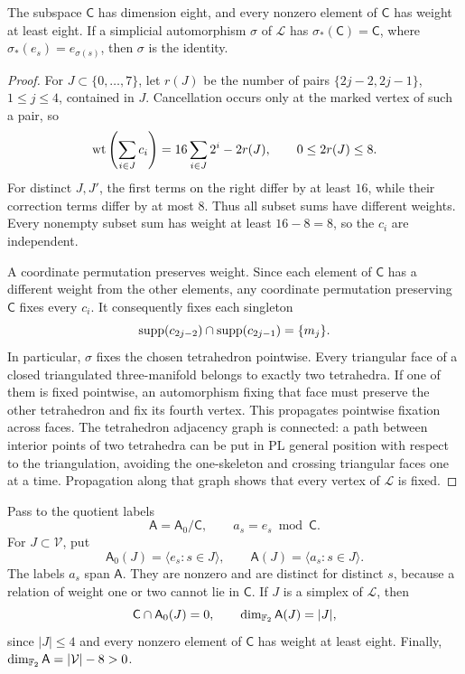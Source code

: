 \begin{lemma}\label{mod:rigid-relations}
The subspace \(\mathsf C\) has dimension eight, and every nonzero
element of \(\mathsf C\) has weight at least eight.  If a simplicial
automorphism \(\sigma\) of \(\mathcal L\) has
\(\sigma_*(\mathsf C)=\mathsf C\), where
\(\sigma_*(e_s)=e_{\sigma(s)}\), then \(\sigma\) is the identity.
\end{lemma}

\begin{proof}
For \(J\subset\{0,\ldots,7\}\), let \(r(J)\) be the number of pairs
\(\{2j-2,2j-1\}\), \(1\leq j\leq4\), contained in \(J\).
Cancellation occurs only at the marked vertex of such a pair, so
\begin{equation}\label{mod:weight-formula}
 \operatorname{wt}\left(\sum_{i\in J}c_i\right)
   =16\sum_{i\in J}2^i-2r(J),\qquad 0\leq2r(J)\leq8.
\end{equation}
For distinct \(J,J'\), the first terms on the right differ by at least
\(16\), while their correction terms differ by at most \(8\).  Thus
all subset sums have different weights.  Every nonempty subset sum has
weight at least \(16-8=8\), so the \(c_i\) are independent.

A coordinate permutation preserves weight.  Since each element of
\(\mathsf C\) has a different weight from the other elements, any
coordinate permutation preserving \(\mathsf C\) fixes every \(c_i\).
It consequently fixes each singleton
\[
 \operatorname{supp}(c_{2j-2})\cap\operatorname{supp}(c_{2j-1})=\{m_j\}.
\]
In particular, \(\sigma\) fixes the chosen tetrahedron pointwise.
Every triangular face of a closed triangulated three-manifold belongs
to exactly two tetrahedra.  If one of them is fixed pointwise, an
automorphism fixing that face must preserve the other tetrahedron and
fix its fourth vertex.  This propagates pointwise fixation across
faces.  The tetrahedron adjacency graph is connected: a path between
interior points of two tetrahedra can be put in PL general position
with respect to the triangulation, avoiding the one-skeleton and
crossing triangular faces one at a time.  Propagation along that graph
shows that every vertex of \(\mathcal L\) is fixed.
\end{proof}

Pass to the quotient labels
\begin{equation}\label{mod:label-quotient}
 \mathsf A=\mathsf A_0/\mathsf C,\qquad a_s=e_s\bmod\mathsf C.
\end{equation}
For \(J\subset\mathcal V\), put
\[
 \mathsf A_0(J)=\langle e_s:s\in J\rangle,\qquad
 \mathsf A(J)=\langle a_s:s\in J\rangle.
\]
The labels \(a_s\) span \(\mathsf A\).  They are nonzero and are
distinct for distinct \(s\), because a relation of weight one or two
cannot lie in \(\mathsf C\).  If \(J\) is a simplex of \(\mathcal L\), then
\begin{equation}\label{mod:simplex-independence}
 \mathsf C\cap\mathsf A_0(J)=0,
 \qquad \dim_{\mathbb F_2}\mathsf A(J)=|J|,
\end{equation}
since \(|J|\leq4\) and every nonzero element of \(\mathsf C\) has
weight at least eight.  Finally,
\(\dim_{\mathbb F_2}\mathsf A=|\mathcal V|-8>0\).

